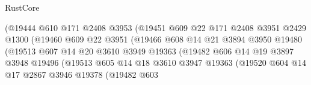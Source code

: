 \begin{lexlean}{RustCore}
\begin{coremodule}
                                  (@19444
                                    @610
                                    @171
                                    @2408
                                    @3953
                                    (@19451
                                      @609
                                      @22
                                      @171
                                      @2408
                                      @3951
                                      @2429
                                      @1300
                                      (@19460
                                        @609
                                        @22
                                        @3951
                                        (@19466
                                          @608
                                          @14
                                          @21
                                          @3894
                                          @3950
                                          @19480
                                          (@19513
                                            @607
                                            @14
                                            @20
                                            @3610
                                            @3949
                                            @19363
                                            (@19482
                                              @606
                                              @14
                                              @19
                                              @3897
                                              @3948
                                              @19496
                                              (@19513
                                                @605
                                                @14
                                                @18
                                                @3610
                                                @3947
                                                @19363
                                                (@19520
                                                  @604
                                                  @14
                                                  @17
                                                  @2867
                                                  @3946
                                                  @19378
                                                  (@19482
                                                    @603

\end{coremodule}
\end{lexlean}

